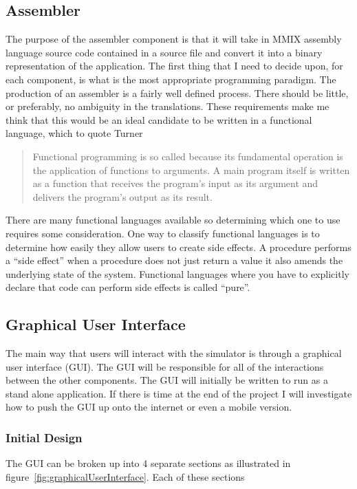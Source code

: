 \documentclass[11pt]{article} %
\begin{document}
\subsection{Assembler}
% 
The purpose of the assembler component is that it will take in MMIX assembly language source code contained in a source file and convert it into a binary representation of the application.  The first thing that I need to decide upon, for each component, is what is the most appropriate programming paradigm.  The production of an assembler is a fairly well defined process.  There should be little, or preferably, no ambiguity in the translations.  These requirements make me think that this would be an ideal candidate to be written in a functional language, which to quote Turner~\cite{turner:why}
\begin{quote}Functional programming is so called because its fundamental operation is the application of functions to arguments. A main program itself is written as a function that receives the program’s input as its argument and delivers the program’s output as its result.\end{quote}

There are many functional languages available so determining which one to use requires some consideration.  One way to classify functional languages is to determine how easily they allow users to create side effects. A procedure performs a ``side effect'' when a procedure does not just return a value it also amends the underlying state of the system.   Functional languages where you have to explicitly declare that code can perform side effects is called ``pure''.  

\subsection{Graphical User Interface}
%
The main way that users will interact with the simulator is through a graphical user interface (GUI).  The GUI will be responsible for all of the interactions between the other components. The GUI will initially be written to run as a stand alone application.  If there is time at the end of the project I  will investigate how to push the GUI up onto the internet or even a mobile version.

\subsubsection{Initial Design}
The GUI can be broken up into 4 separate sections as illustrated in figure~\ref{fig:graphicalUserInterface}.  Each of these sections 
\end{document}
